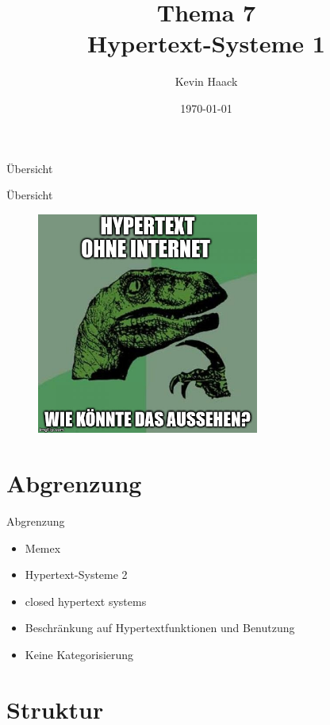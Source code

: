 \documentclass{beamer}
\title{Thema 7\\Hypertext-Systeme 1}
\author{Kevin Haack}
\institute{Universität Paderborn}
\date{\today}
\begin{document}
\begin{frame}
  \titlepage
\end{frame}

\begin{frame}{Übersicht}
\tableofcontents
\end{frame}

\begin{frame}{Übersicht}
	\begin{figure}[htbp]
		\centering
		\includegraphics[width=0.65\textwidth]{images/philosoraptor}
	\end{figure}
\end{frame}

\section{Abgrenzung}
\begin{frame}{Abgrenzung}
	\begin{itemize}
		\item Memex
		\item Hypertext-Systeme 2
		\item closed hypertext systems
		\item Beschränkung auf Hypertextfunktionen und Benutzung
		\item Keine Kategorisierung
	\end{itemize}
\end{frame}



\section{Struktur}
\end{document}
